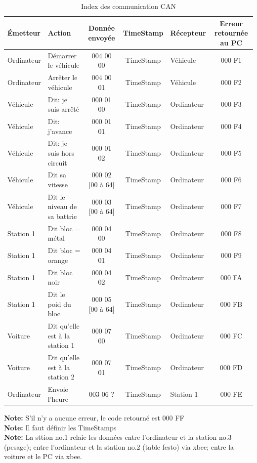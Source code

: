 \documentclass[10pt,a4paper,final]{article}
\begin{document}
\begin{spacing}{1.5}
\begin{table}[!ht]
\caption{Index des communication CAN}
\medskip
\centering
\begin{tabular}{|l|l|c|c|l|c|}
\hline 
\textbf{Émetteur} & \textbf{Action} & \textbf{Donnée envoyée} & \textbf{TimeStamp} & \textbf{Récepteur} & \textbf{Erreur retournée au PC}\\ 
\hline 
Ordinateur & Démarrer le véhicule & 004 00 00 & TimeStamp & Véhicule & 000 F1\\ 
\hline 
Ordinateur & Arrêter le véhicule & 004 00 01 & TimeStamp & Véhicule & 000 F2\\ 
\hline 
Véhicule & Dit: je suis arrêté & 000 01 00  & TimeStamp & Ordinateur & 000 F3\\
\hline 
Véhicule & Dit: j'avance & 000 01 01 & TimeStamp & Ordinateur  & 000 F4\\  
\hline 
Véhicule & Dit: je suis hors circuit & 000 01 02 & TimeStamp & Ordinateur & 000 F5\\ 
\hline 
Véhicule & Dit sa vitesse & 000 02 [00 à 64] & TimeStamp & Ordinateur & 000 F6\\ 
\hline 
Véhicule & Dit le niveau de sa battrie & 000 03 [00 à 64] & TimeStamp & Ordinateur & 000 F7\\ 
\hline 
Station 1 & Dit bloc = métal & 000 04 00 & TimeStamp & Ordinateur & 000 F8\\ 
\hline  
Station 1 & Dit bloc = orange & 000 04 01 & TimeStamp & Ordinateur & 000 F9\\
\hline 
Station 1 & Dit bloc = noir & 000 04 02 & TimeStamp & Ordinateur & 000 FA\\
\hline 
Station 1 & Dit le poid du bloc & 000 05 [00 à 64] & TimeStamp & Ordinateur & 000 FB\\ 
\hline 
Voiture & Dit qu'elle est à la station 1 & 000 07 00 & TimeStamp & Ordinateur & 000 FC\\ 
\hline 
Voiture & Dit qu'elle est à la station 2 & 000 07 01 & TimeStamp & Ordinateur & 000 FD\\
\hline 
Ordinateur & Envoie l'heure & 003 06 ? & TimeStamp & Station 1 & 000 FE\\ 
\hline 
\end{tabular} 
\label{tab:testtab1}
\end{table}
\begin{flushleft}
\textbf{Note:} S'il n'y a aucune erreur, le code retourné est 000 FF\\
\textbf{Note:} Il faut définir les TimeStamps\\
\textbf{Note:} La sttion no.1 relaie les données entre l'ordinateur et la station no.3 (pesage); entre l'ordinateur et la station no.2 (table festo) via xbee; entre la voiture et le PC via xbee.
\end{flushleft}
\pagebreak



\end{spacing}
\end{document}
